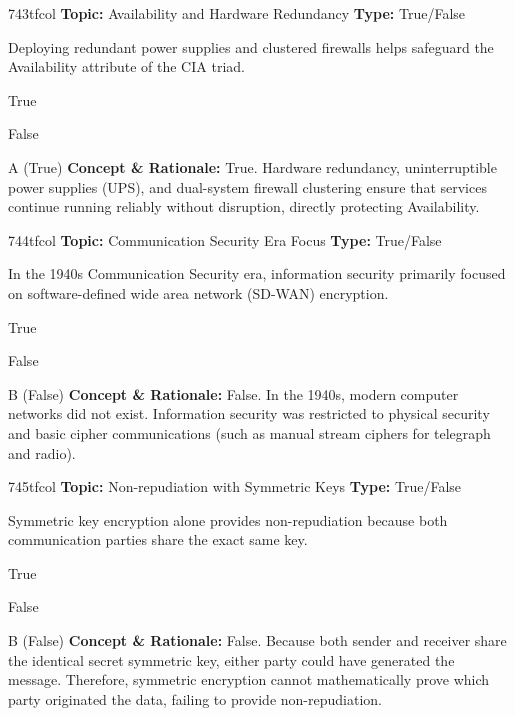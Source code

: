 \begin{qcard}{743}{tfcol}
\textcolor{darkslate!75}{\small\textbf{Topic:} Availability and Hardware Redundancy \hfill \textbf{Type:} True/False}\vspace{0.4em}\par
Deploying redundant power supplies and clustered firewalls helps safeguard the Availability attribute of the CIA triad.
\begin{qoptions}
\item True
\item False
\end{qoptions}
\end{qcard}
\nopagebreak
\begin{explainbox}{A (True)}
\textbf{Concept \& Rationale:} True. Hardware redundancy, uninterruptible power supplies (UPS), and dual-system firewall clustering ensure that services continue running reliably without disruption, directly protecting Availability.
\end{explainbox}

\begin{qcard}{744}{tfcol}
\textcolor{darkslate!75}{\small\textbf{Topic:} Communication Security Era Focus \hfill \textbf{Type:} True/False}\vspace{0.4em}\par
In the 1940s Communication Security era, information security primarily focused on software-defined wide area network (SD-WAN) encryption.
\begin{qoptions}
\item True
\item False
\end{qoptions}
\end{qcard}
\nopagebreak
\begin{explainbox}{B (False)}
\textbf{Concept \& Rationale:} False. In the 1940s, modern computer networks did not exist. Information security was restricted to physical security and basic cipher communications (such as manual stream ciphers for telegraph and radio).
\end{explainbox}

\begin{qcard}{745}{tfcol}
\textcolor{darkslate!75}{\small\textbf{Topic:} Non-repudiation with Symmetric Keys \hfill \textbf{Type:} True/False}\vspace{0.4em}\par
Symmetric key encryption alone provides non-repudiation because both communication parties share the exact same key.
\begin{qoptions}
\item True
\item False
\end{qoptions}
\end{qcard}
\nopagebreak
\begin{explainbox}{B (False)}
\textbf{Concept \& Rationale:} False. Because both sender and receiver share the identical secret symmetric key, either party could have generated the message. Therefore, symmetric encryption cannot mathematically prove which party originated the data, failing to provide non-repudiation.
\end{explainbox}

